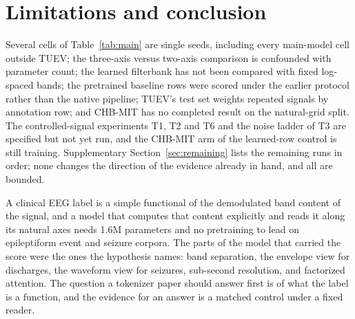 \section{Limitations and conclusion}
\label{sec:limitations}

Several cells of Table~\ref{tab:main} are single seeds, including every main-model cell outside TUEV; the three-axis versus two-axis comparison is confounded with parameter count; the learned filterbank has not been compared with fixed log-spaced bands; the pretrained baseline rows were scored under the earlier protocol rather than the native pipeline; TUEV's test set weights repeated signals by annotation row; and CHB-MIT has no completed result on the natural-grid split. The controlled-signal experiments T1, T2 and T6 and the noise ladder of T3 are specified but not yet run, and the CHB-MIT arm of the learned-row control is still training. Supplementary Section~\ref{sec:remaining} lists the remaining runs in order; none changes the direction of the evidence already in hand, and all are bounded.

A clinical EEG label is a simple functional of the demodulated band content of the signal, and a model that computes that content explicitly and reads it along its natural axes needs 1.6M parameters and no pretraining to lead on epileptiform event and seizure corpora. The parts of the model that carried the score were the ones the hypothesis names: band separation, the envelope view for discharges, the waveform view for seizures, sub-second resolution, and factorized attention. The question a tokenizer paper should answer first is of what the label is a function, and the evidence for an answer is a matched control under a fixed reader.
